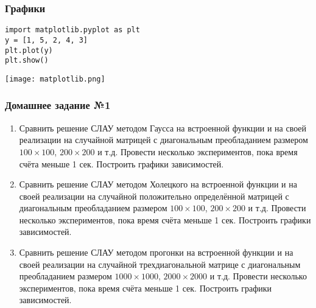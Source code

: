 \documentclass[10pt]{beamer}
\begin{document}
\begin{frame}[fragile]
\frametitle{Графики}

\begin{lstlisting}
import matplotlib.pyplot as plt
y = [1, 5, 2, 4, 3]
plt.plot(y)
plt.show()
\end{lstlisting}

\begin{center}
\texttt{[image: matplotlib.png]}
\end{center}
\end{frame}


\begin{frame}[fragile]
\frametitle{Домашнее задание №1}

\begin{enumerate}
\item Сравнить решение СЛАУ методом Гаусса на встроенной функции и  на своей реализации на случайной матрицей с диагональным преобладанием размером $100 \times 100$, $200 \times 200$ и т.д. Провести несколько экспериментов, пока время счёта меньше 1 сек. Построить графики зависимостей.

\item Сравнить решение СЛАУ методом Холецкого на встроенной функции и  на своей реализации на случайной положительно определённой матрицей с диагональным преобладанием размером $100 \times 100$, $200 \times 200$ и т.д. Провести несколько экспериментов, пока время счёта меньше 1 сек. Построить графики зависимостей.

\item Сравнить решение СЛАУ методом прогонки на встроенной функции и  на своей реализации на случайной трехдиагональной матрице с диагональным преобладанием размером $1000 \times 1000$, $2000 \times 2000$ и т.д. Провести несколько экспериментов, пока время счёта меньше 1 сек. Построить графики зависимостей.
\end{enumerate}

\end{frame}
\end{document}

